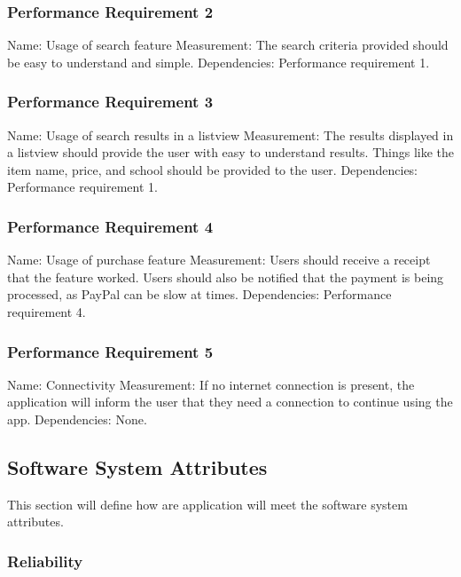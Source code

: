 \documentclass[journal,compsoc, 10pt, draftclsnofoot, onecolumn]{IEEEtran}
\begin{document}
\subsubsection{Performance Requirement 2}
Name: Usage of search feature\newline
Measurement: The search criteria provided should be easy to understand and 
simple.\newline
Dependencies: Performance requirement 1.

\subsubsection{Performance Requirement 3}
Name: Usage of search results in a listview\newline
Measurement: The results displayed in a listview should provide the user with 
easy to understand results. Things like the item name, price, and school should 
be provided to the user.\newline
Dependencies: Performance requirement 1.

\subsubsection{Performance Requirement 4}
Name: Usage of purchase feature\newline
Measurement: Users should receive a receipt that the feature worked. Users 
should also be notified that the payment is being processed, as PayPal can
be slow at times.\newline 
Dependencies: Performance requirement 4.

\subsubsection{Performance Requirement 5}
Name: Connectivity 
Measurement: If no internet connection is present, the application will inform
the user that they need a connection to continue using the app.
Dependencies: None.

\subsection{Software System Attributes}

This section will define how are application will meet the software system 
attributes.

\subsubsection{Reliability}
\end{document}
